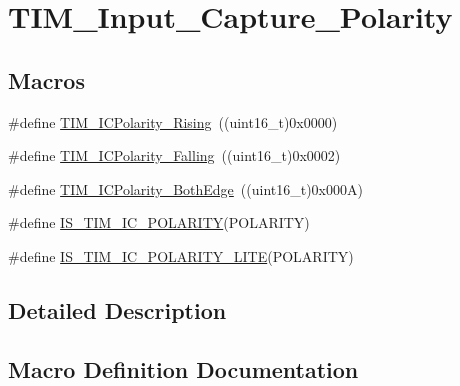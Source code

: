 \hypertarget{group___t_i_m___input___capture___polarity}{}\section{T\+I\+M\+\_\+\+Input\+\_\+\+Capture\+\_\+\+Polarity}
\label{group___t_i_m___input___capture___polarity}
\subsection*{Macros}
\begin{DoxyCompactItemize}
\item 
\#define \mbox{\hyperlink{group___t_i_m___input___capture___polarity_gabe598596b7dbcac446a4918105fa95a6}{T\+I\+M\+\_\+\+I\+C\+Polarity\+\_\+\+Rising}}~((uint16\+\_\+t)0x0000)
\item 
\#define \mbox{\hyperlink{group___t_i_m___input___capture___polarity_ga70c6f5ed30a236bac4c690928e742243}{T\+I\+M\+\_\+\+I\+C\+Polarity\+\_\+\+Falling}}~((uint16\+\_\+t)0x0002)
\item 
\#define \mbox{\hyperlink{group___t_i_m___input___capture___polarity_ga4632a6425d407c0d28b610b2d31cccc8}{T\+I\+M\+\_\+\+I\+C\+Polarity\+\_\+\+Both\+Edge}}~((uint16\+\_\+t)0x000\+A)
\item 
\#define \mbox{\hyperlink{group___t_i_m___input___capture___polarity_ga6aff2fe442fd9662a0bb8731134cda89}{I\+S\+\_\+\+T\+I\+M\+\_\+\+I\+C\+\_\+\+P\+O\+L\+A\+R\+I\+TY}}(P\+O\+L\+A\+R\+I\+TY)
\item 
\#define \mbox{\hyperlink{group___t_i_m___input___capture___polarity_gaaae722dd6c33a224df267c703824b94c}{I\+S\+\_\+\+T\+I\+M\+\_\+\+I\+C\+\_\+\+P\+O\+L\+A\+R\+I\+T\+Y\+\_\+\+L\+I\+TE}}(P\+O\+L\+A\+R\+I\+TY)
\end{DoxyCompactItemize}


\subsection{Detailed Description}


\subsection{Macro Definition Documentation}
\mbox{\label{group___t_i_m___input___capture___polarity_ga6aff2fe442fd9662a0bb8731134cda89}} 
